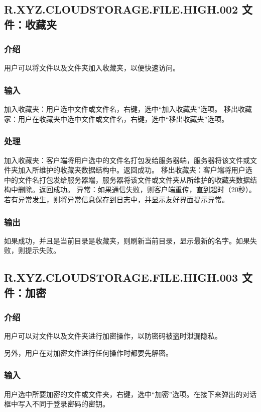 \subsection{R.XYZ.CLOUDSTORAGE.FILE.HIGH.002 文件：收藏夹}

\subsubsection{介绍} 
用户可以将文件以及文件夹加入收藏夹，以便快速访问。

\subsubsection{输入} 
加入收藏夹：用户选中文件或文件名，右键，选中“加入收藏夹”选项。
移出收藏家：用户在收藏夹中选中文件或文件名，右键，选中“移出收藏夹”选项。

\subsubsection{处理}
加入收藏夹：客户端将用户选中的文件名打包发给服务器端，服务器将该文件或文件夹加入所维护的收藏夹数据结构中。返回成功。
移出收藏夹：客户端将用户选中的文件名打包发给服务器端，服务器将该文件或文件夹从所维护的收藏夹数据结构中删除。返回成功。
异常：如果通信失败，则客户端重传，直到超时（20秒）。
若有异常发生，则将异常信息保存到日志中，并显示友好界面提示异常。

\subsubsection{输出}
如果成功，并且是当前目录是收藏夹，则刷新当前目录，显示最新的名字。如果失败，则提示失败。



\subsection{R.XYZ.CLOUDSTORAGE.FILE.HIGH.003 文件：加密}

\subsubsection{介绍}
用户可以对文件以及文件夹进行加密操作，以防密码被盗时泄漏隐私。 

另外，用户在对加密文件进行任何操作时都要先解密。

\subsubsection{输入} 
用户选中所要加密的文件或文件夹，右键，选中“加密”选项。在接下来弹出的对话框中写入不同于登录密码的密钥。

